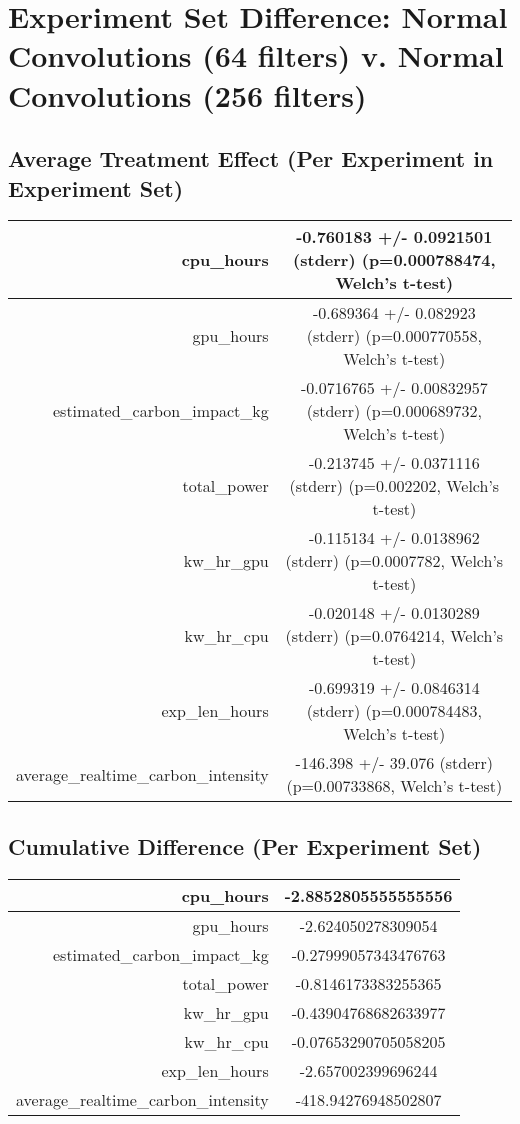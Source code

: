 \documentclass{article}%
\begin{document}
%
\normalsize%
\section{Experiment Set Difference: Normal Convolutions (64 filters) v. Normal Convolutions (256 filters)}%
\label{sec:Experiment Set Difference Normal Convolutions (64 filters) v. Normal Convolutions (256 filters)}%
\subsection{Average Treatment Effect (Per Experiment in Experiment Set)}%
\label{subsec:Average Treatment Effect (Per Experiment in Experiment Set)}%
\begin{tabular}{|r|c|}%
\hline%
cpu\_hours&{-}0.760183 +/{-} 0.0921501 (stderr) (p=0.000788474, Welch's t{-}test)\\%
\hline%
gpu\_hours&{-}0.689364 +/{-} 0.082923 (stderr) (p=0.000770558, Welch's t{-}test)\\%
\hline%
estimated\_carbon\_impact\_kg&{-}0.0716765 +/{-} 0.00832957 (stderr) (p=0.000689732, Welch's t{-}test)\\%
\hline%
total\_power&{-}0.213745 +/{-} 0.0371116 (stderr) (p=0.002202, Welch's t{-}test)\\%
\hline%
kw\_hr\_gpu&{-}0.115134 +/{-} 0.0138962 (stderr) (p=0.0007782, Welch's t{-}test)\\%
\hline%
kw\_hr\_cpu&{-}0.020148 +/{-} 0.0130289 (stderr) (p=0.0764214, Welch's t{-}test)\\%
\hline%
exp\_len\_hours&{-}0.699319 +/{-} 0.0846314 (stderr) (p=0.000784483, Welch's t{-}test)\\%
\hline%
average\_realtime\_carbon\_intensity&{-}146.398 +/{-} 39.076 (stderr) (p=0.00733868, Welch's t{-}test)\\%
\hline%
\end{tabular}

%
\subsection{Cumulative Difference (Per Experiment Set)}%
\label{subsec:Cumulative Difference (Per Experiment Set)}%
\begin{tabular}{|r|c|}%
\hline%
cpu\_hours&{-}2.8852805555555556\\%
\hline%
gpu\_hours&{-}2.624050278309054\\%
\hline%
estimated\_carbon\_impact\_kg&{-}0.27999057343476763\\%
\hline%
total\_power&{-}0.8146173383255365\\%
\hline%
kw\_hr\_gpu&{-}0.43904768682633977\\%
\hline%
kw\_hr\_cpu&{-}0.07653290705058205\\%
\hline%
exp\_len\_hours&{-}2.657002399696244\\%
\hline%
average\_realtime\_carbon\_intensity&{-}418.94276948502807\\%
\hline%
\end{tabular}

%
\end{document}

